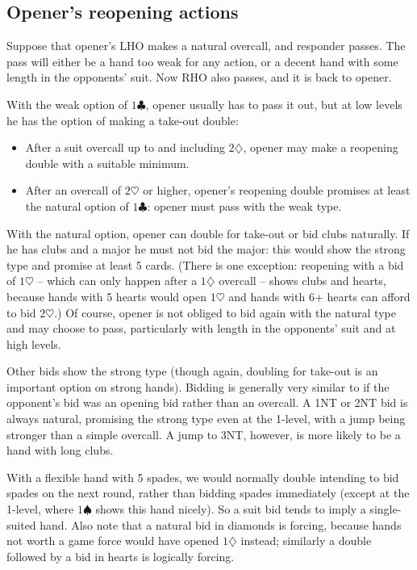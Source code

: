 \documentclass{article}
\newcommand{\sz}{\spadesuit}
\newcommand{\hz}{\heartsuit}
\newcommand{\dz}{\diamondsuit}
\newcommand{\cz}{\clubsuit}
\begin{document}
\subsection{Opener's reopening actions}

Suppose that opener's LHO makes a natural overcall, and responder passes. The pass will either be a hand too weak for any action, or a decent hand with some length in the opponents' suit. Now RHO also passes, and it is back to opener.

With the weak option of $1\cz$, opener usually has to pass it out, but at low levels he has the option of making a take-out double:

\begin{itemize}
\item After a suit overcall up to and including $2\dz$, opener may make a reopening double with a suitable minimum.
\item After an overcall of $2\hz$ or higher, opener's reopening double promises at least the natural option of $1\cz$: opener must pass with the weak type.
\end{itemize}

With the natural option, opener can double for take-out or bid clubs naturally. If he has clubs and a major he must not bid the major: this would show the strong type and promise at least 5 cards. (There is one exception: reopening with a bid of $1\hz$ -- which can only happen after a $1\dz$ overcall -- shows clubs and hearts, because hands with 5 hearts would open $1\hz$ and hands with 6+ hearts can afford to bid $2\hz$.) Of course, opener is not obliged to bid again with the natural type and may choose to pass, particularly with length in the opponents' suit and at high levels.

Other bids show the strong type (though again, doubling for take-out is an important option on strong hands). Bidding is generally very similar to if the opponent's bid was an opening bid rather than an overcall. A 1NT or 2NT bid is always natural, promising the strong type even at the 1-level, with a jump being stronger than a simple overcall. A jump to 3NT, however, is more likely to be a hand with long clubs.

With a flexible hand with 5 spades, we would normally double intending to bid spades on the next round, rather than bidding spades immediately (except at the 1-level, where $1\sz$ shows this hand nicely). So a suit bid tends to imply a single-suited hand. Also note that a natural bid in diamonds is forcing, because hands not worth a game force would have opened $1\dz$ instead; similarly a double followed by a bid in hearts is logically forcing.
\end{document}
